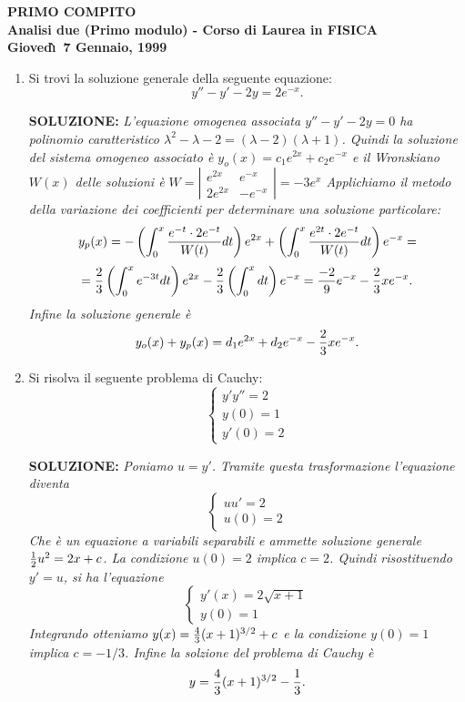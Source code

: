 \documentclass[12pt,a4paper]{report}\pagenumbering{roman}
\begin{document}
\begin{center}
\textbf{PRIMO COMPITO}\\
\textbf{Analisi due (Primo modulo) - Corso di Laurea in FISICA}\\
\textbf{Gioved\`\i\ 7 Gennaio, 1999}
\end{center}

\begin{enumerate}
\item Si trovi la soluzione generale della seguente equazione:
$$y''-y'-2y=2e^{-x}.$$

{\bf SOLUZIONE:} {\it L'equazione omogenea associata $y''-y'-2y=0$ ha 
polinomio caratteristico $\lambda^2-\lambda -2=(\lambda-2)(\lambda+1)$. Quindi la soluzione
del sistema omogeneo associato \`e
$y_o(x)=c_1e^{2x}+c_2e^{-x}$ e il Wronskiano $W(x)$ delle soluzioni \`e 
$W=\left|\begin{array}{cc} e^{2x}&  e^{-x}\\ 2e^{2x}& -e^{-x}\end{array}\right|=-3e^x$
Applichiamo il metodo della variazione dei coefficienti 
per determinare una soluzione particolare:
$$y_p(x)=-\left(\int_0^x{e^{-t}\cdot 2e^{-t}\over W(t)} dt\right)e^{2x}+\left(\int_0^x{e^{2t}\cdot
2e^{-t}\over W(t)} dt\right)e^{-x}=$$
$$= {2\over3}\left(\int_0^x e^{-3t}dt\right)e^{2x}-{2\over3}\left(\int_0^xdt\right)e^{-x}=
{-2\over9}e^{-x}-{2\over3}xe^{-x}.$$
Infine la soluzione generale \`e
$$y_o(x)+y_p(x)=d_1e^{2x}+d_2e^{-x}-{2\over3}xe^{-x}.$$}

\item Si risolva il seguente problema di Cauchy:
$$\left\{\begin{array}{l} y'y''=2 \\ y(0)=1\\ y'(0)=2
\end{array}\right.$$

{\bf SOLUZIONE:} {\it Poniamo $u=y'$. Tramite questa trasformazione l'equa\-zio\-ne diventa
$$\left\{\begin{array}{l} uu'=2 \\ u(0)=2
\end{array}\right.$$
Che \`e un equazione a variabili separabili e ammette soluzione generale ${1\over 2}u^2=2x+c$.
La condizione $u(0)=2$ implica $c=2$. Quindi risostituendo $y'=u$, si ha l'equazione
$$\left\{\begin{array}{l} y'(x)=2\sqrt{x+1} \\ y(0)=1
\end{array}\right.$$
Integrando otteniamo $y(x)={4\over 3}(x+1)^{3/2}+c$ e
la condizione $y(0)=1$ implica $c=-1/3$. Infine la solzione del problema di Cauchy \`e
$$y={4\over 3}(x+1)^{3/2}-{1\over3}.$$}


\end{enumerate}
\end{document}
